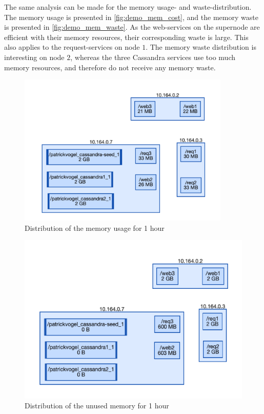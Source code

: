 \noindent
The same analysis can be made for the memory usage- and waste-distribution. The memory usage is presented in \autoref{fig:demo_mem_cost}, and the memory waste is presented in \autoref{fig:demo_mem_waste}. As the web-services on the supernode are efficient with their memory resources, their corresponding waste is large. This also applies to the request-services on node $1$. The memory waste distribution is interesting on node $2$, whereas the three Cassandra services use too much memory resources, and therefore do not receive any memory waste.\\

\begin{figure}[H]
    \centering
    \includegraphics[width=0.9\textwidth]{gfx/demo_mem_cost}
    \caption{Distribution of the memory usage for 1 hour}
    \label{fig:demo_mem_cost}
\end{figure}

\begin{figure}[H]
    \centering
    \includegraphics[width=\textwidth]{gfx/demo_mem_waste}
    \caption{Distribution of the unused memory for 1 hour}
    \label{fig:demo_mem_waste}
\end{figure}

